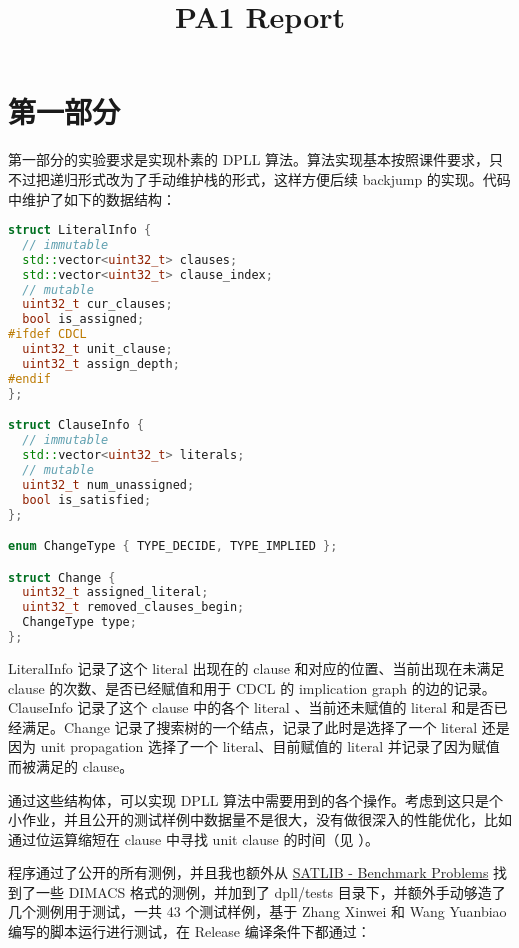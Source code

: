 \documentclass[11pt,a4paper]{ctexart}
\title{PA1 Report}
\begin{document}
\maketitle


\section{第一部分}

第一部分的实验要求是实现朴素的 DPLL 算法。算法实现基本按照课件要求，只不过把递归形式改为了手动维护栈的形式，这样方便后续 backjump 的实现。代码中维护了如下的数据结构：

\begin{lstlisting}[language=c++]
struct LiteralInfo {
  // immutable
  std::vector<uint32_t> clauses;
  std::vector<uint32_t> clause_index;
  // mutable
  uint32_t cur_clauses;
  bool is_assigned;
#ifdef CDCL
  uint32_t unit_clause;
  uint32_t assign_depth;
#endif
};

struct ClauseInfo {
  // immutable
  std::vector<uint32_t> literals;
  // mutable
  uint32_t num_unassigned;
  bool is_satisfied;
};

enum ChangeType { TYPE_DECIDE, TYPE_IMPLIED };

struct Change {
  uint32_t assigned_literal;
  uint32_t removed_clauses_begin;
  ChangeType type;
};
\end{lstlisting}

LiteralInfo 记录了这个 literal 出现在的 clause 和对应的位置、当前出现在未满足 clause 的次数、是否已经赋值和用于 CDCL 的 implication graph 的边的记录。ClauseInfo 记录了这个 clause 中的各个 literal 、当前还未赋值的 literal 和是否已经满足。Change 记录了搜索树的一个结点，记录了此时是选择了一个 literal 还是因为 unit propagation 选择了一个 literal、目前赋值的 literal 并记录了因为赋值而被满足的 clause。

通过这些结构体，可以实现 DPLL 算法中需要用到的各个操作。考虑到这只是个小作业，并且公开的测试样例中数据量不是很大，没有做很深入的性能优化，比如通过位运算缩短在 clause 中寻找 unit clause 的时间（见 \cite{ahmed_implementation_nodate} ）。

程序通过了公开的所有测例，并且我也额外从 \href{https://www.cs.ubc.ca/~hoos/SATLIB/benchm.html}{SATLIB - Benchmark Problems} 找到了一些 DIMACS 格式的测例，并加到了 dpll/tests 目录下，并额外手动够造了几个测例用于测试，一共 43 个测试样例，基于 Zhang Xinwei 和 Wang Yuanbiao 编写的脚本运行进行测试，在 Release 编译条件下都通过：
\end{document}
